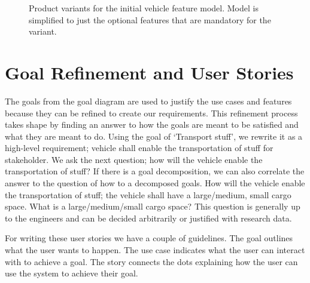 \begin{figure}
	\centering
	
	\caption{Product variants for the initial vehicle feature model. Model is simplified to just the optional features that are mandatory for the variant.}
	\label{fig:veh_variants}
\end{figure}

\section{Goal Refinement and User Stories}

The goals from the goal diagram are used to justify the use cases and features because they can be refined to create our requirements. This refinement process takes shape by finding an answer to how the goals are meant to be satisfied and what they are meant to do. Using the goal of `Transport stuff', we rewrite it as a high-level requirement; vehicle shall enable the transportation of stuff for stakeholder. We ask the next question; how will the vehicle enable the transportation of stuff? If there is a goal decomposition, we can also correlate the answer to the question of how to a decomposed goals. How will the vehicle enable the transportation of stuff; the vehicle shall have a large/medium, small cargo space. What is a large/medium/small cargo space? This question is generally up to the engineers and can be decided arbitrarily or justified with research data. 



For writing these user stories we have a couple of guidelines. The goal outlines what the user wants to happen. The use case indicates what the user can interact with to achieve a goal. The story connects the dots explaining how the user can use the system to achieve their goal.


